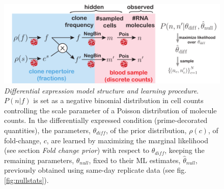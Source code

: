 \documentclass[letterpaper,english,prl,reprint,longbibliography]{revtex4-1} %
\begin{document}
\begin{figure}[ht!]
\includegraphics{fig2_diffexprmodel_schematic}
\centering{}
\caption{
\emph{Differential expression model structure and learning procedure}. $P(n|f)$ is set as a negative binomial distribution in cell counts controlling the scale parameter of a Poisson distribution of molecule counts. In the differentially expressed condition (prime-decorated quantities), the parameters, $\theta_{diff}$, of the prior distribution, $\rho(c)$, of fold-change, $c$, are learned by maximizing the marginal likelihood (see section \textit{Fold change prior}) with respect to $\theta_{diff}$, keeping the remaining parameters, $\theta_{null}$, fixed to their ML estimates, $\hat{\theta}_{null}$, previously obtained using same-day replicate data (see fig. \ref{fig:nullstats}). 
\label{fig:modelstruct}}
\end{figure}

\end{document}
